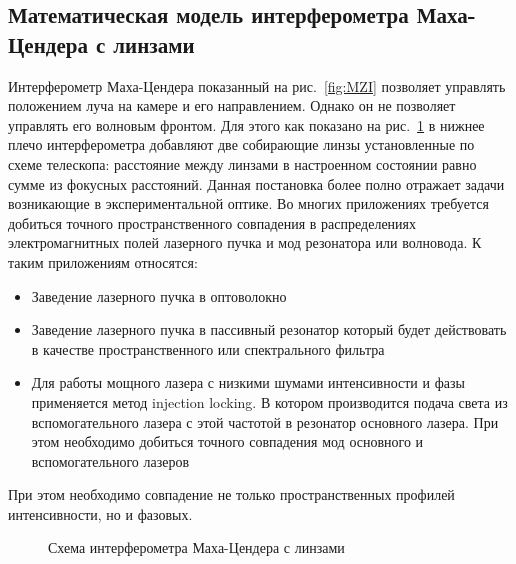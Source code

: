 \subsection{Математическая модель интерферометра Маха-Цендера с линзами}\label{sec:ch2/sec1/subsec4}

Интерферометр Маха-Цендера показанный на рис.~\ref{fig:MZI} позволяет управлять положением луча на камере и его направлением. Однако он не позволяет управлять его волновым фронтом. Для этого как показано на рис.~\ref{fig:MZI_expl_lenses} в нижнее плечо интерферометра добавляют две собирающие линзы установленные по схеме телескопа: расстояние между линзами в настроенном состоянии равно сумме из фокусных расстояний. Данная постановка более полно отражает задачи возникающие в экспериментальной оптике. Во многих приложениях требуется добиться точного пространственного совпадения в распределениях электромагнитных полей лазерного пучка и мод резонатора или волновода. К таким приложениям относятся: 

\begin{itemize}
    \item Заведение лазерного пучка в оптоволокно
    \item Заведение лазерного пучка в пассивный резонатор который будет действовать в качестве пространственного или спектрального фильтра 
    \item Для работы мощного лазера с низкими шумами интенсивности и фазы применяется метод injection locking. В котором производится подача света из вспомогательного лазера с этой частотой в резонатор основного лазера. При этом необходимо добиться точного совпадения мод основного и вспомогательного лазеров
\end{itemize}

При этом необходимо совпадение не только пространственных профилей интенсивности, но и фазовых.

\begin{figure}[ht]
\caption{Схема интерферометра Маха-Цендера с линзами}
\label{fig:MZI_expl_lenses}
\end{figure}

